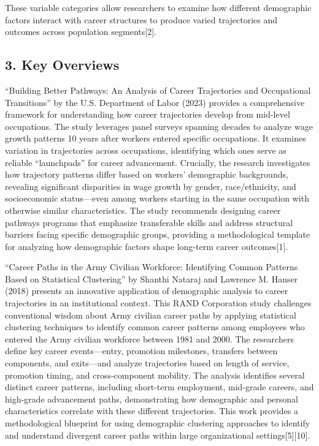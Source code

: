 \documentclass[
  letterpaper,
  DIV=11,
  numbers=noendperiod]{scrartcl}
\begin{document}
These variable categories allow researchers to examine how different
demographic factors interact with career structures to produce varied
trajectories and outcomes across population segments{[}2{]}.

\subsection{3. Key Overviews}\label{key-overviews}

``Building Better Pathways: An Analysis of Career Trajectories and
Occupational Transitions'' by the U.S. Department of Labor (2023)
provides a comprehensive framework for understanding how career
trajectories develop from mid-level occupations. The study leverages
panel surveys spanning decades to analyze wage growth patterns 10 years
after workers entered specific occupations. It examines variation in
trajectories across occupations, identifying which ones serve as
reliable ``launchpads'' for career advancement. Crucially, the research
investigates how trajectory patterns differ based on workers'
demographic backgrounds, revealing significant disparities in wage
growth by gender, race/ethnicity, and socioeconomic status---even among
workers starting in the same occupation with otherwise similar
characteristics. The study recommends designing career pathways programs
that emphasize transferable skills and address structural barriers
facing specific demographic groups, providing a methodological template
for analyzing how demographic factors shape long-term career
outcomes{[}1{]}.

``Career Paths in the Army Civilian Workforce: Identifying Common
Patterns Based on Statistical Clustering'' by Shanthi Nataraj and
Lawrence M. Hanser (2018) presents an innovative application of
demographic analysis to career trajectories in an institutional context.
This RAND Corporation study challenges conventional wisdom about Army
civilian career paths by applying statistical clustering techniques to
identify common career patterns among employees who entered the Army
civilian workforce between 1981 and 2000. The researchers define key
career events---entry, promotion milestones, transfers between
components, and exits---and analyze trajectories based on length of
service, promotion timing, and cross-component mobility. The analysis
identifies several distinct career patterns, including short-term
employment, mid-grade careers, and high-grade advancement paths,
demonstrating how demographic and personal characteristics correlate
with these different trajectories. This work provides a methodological
blueprint for using demographic clustering approaches to identify and
understand divergent career paths within large organizational
settings{[}5{]}{[}10{]}.
\end{document}
